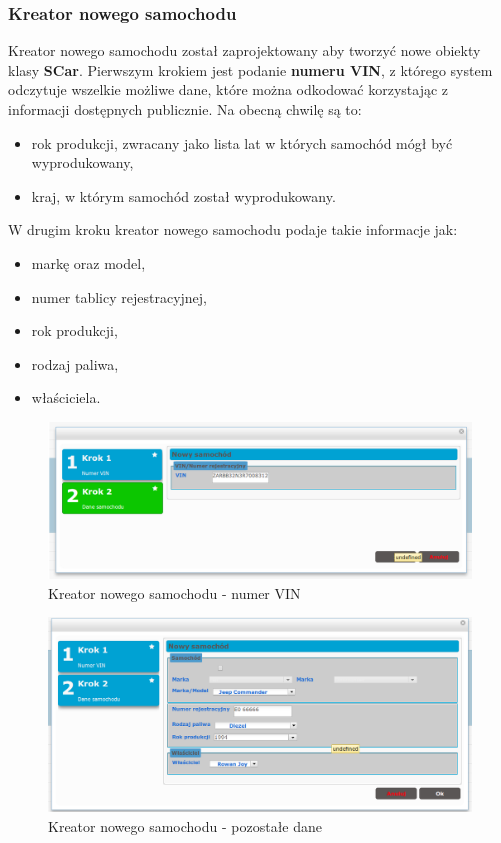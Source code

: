 \subsubsection{Kreator nowego samochodu}
	Kreator nowego samochodu został zaprojektowany aby tworzyć nowe obiekty klasy \textbf{SCar}.	Pierwszym krokiem jest podanie \textbf{numeru VIN}, z którego system odczytuje wszelkie możliwe dane, które można odkodować korzystając z informacji dostępnych publicznie. Na obecną chwilę są to:
	\begin{itemize}
		\item rok produkcji, zwracany jako lista lat w których samochód mógł być wyprodukowany,
		\item kraj, w którym samochód został wyprodukowany.
	\end{itemize}
	
	W drugim kroku kreator nowego samochodu podaje takie informacje jak:
	\begin{itemize}
		\item markę oraz model,
		\item numer tablicy rejestracyjnej,
		\item rok produkcji,
		\item rodzaj paliwa,
		\item właściciela.
	\end{itemize}
	\begin{figure}[H]
		\centering
		\includegraphics[width=1.0\textwidth]{images/newCar-vin}
		\caption[Kreator nowego samochodu - numer VIN]{
			Kreator nowego samochodu - numer VIN
		}
		\label{app:newCar_vin}
	\end{figure}	
	\begin{figure}[H]
		\centering
		\includegraphics[width=1.0\textwidth]{images/newCar-data}
		\caption[Kreator nowego samochodu - pozostałe dane]{
			Kreator nowego samochodu - pozostałe dane
		}
		\label{app:newCar_data}
	\end{figure}

